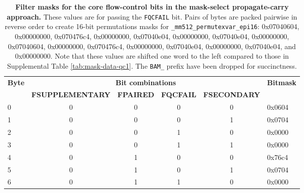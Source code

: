 \begin{table}[]
\centering
\caption{\textbf{Filter masks for the core flow-control bits in the mask-select propagate-carry approach.} These values are for passing the \texttt{FQCFAIL} bit. Pairs of bytes are packed pairwise in reverse order to create 16-bit permutations masks for \texttt{\_mm512\_permutexvar\_epi16}: 0x07040604, 0x00000000, 0x070476c4, 0x00000000, 0x07040e04, 0x00000000, 0x07040e04, 0x00000000, 0x07040604, 0x00000000, 0x070476c4, 0x00000000, 0x07040e04, 0x00000000, 0x07040e04, and 0x00000000. Note that these values are shifted one word to the left compared to those in Supplemental Table \ref{tab:mask-data-qc1}. The \texttt{BAM\_} prefix have been dropped for succinctness.}
\label{tab:mask-data-qc2}
\begin{tabular}{|l|c|c|c|c|l|}
\hline
\multirow{2}{*}{\textbf{Byte}} & \multicolumn{4}{c|}{\textbf{Bit combinations}}                                      & \multirow{2}{*}{\textbf{Bitmask}} \\ \cline{2-5}
                             & \textbf{FSUPPLEMENTARY} & \textbf{FPAIRED} & \textbf{FQCFAIL} & \textbf{FSECONDARY} &                                \\ \hline
0                            & 0                       & 0                & 0                & 0                   & 0x0604                         \\ \hline
1                            & 0                       & 0                & 0                & 1                   & 0x0704                         \\ \hline
2                            & 0                       & 0                & 1                & 0                   & 0x0000                         \\ \hline
3                            & 0                       & 0                & 1                & 1                   & 0x0000                         \\ \hline
4                            & 0                       & 1                & 0                & 0                   & 0x76c4                         \\ \hline
5                            & 0                       & 1                & 0                & 1                   & 0x0704                         \\ \hline
6                            & 0                       & 1                & 1                & 0                   & 0x0000                         \\ \hline

\end{tabular}
\end{table}
